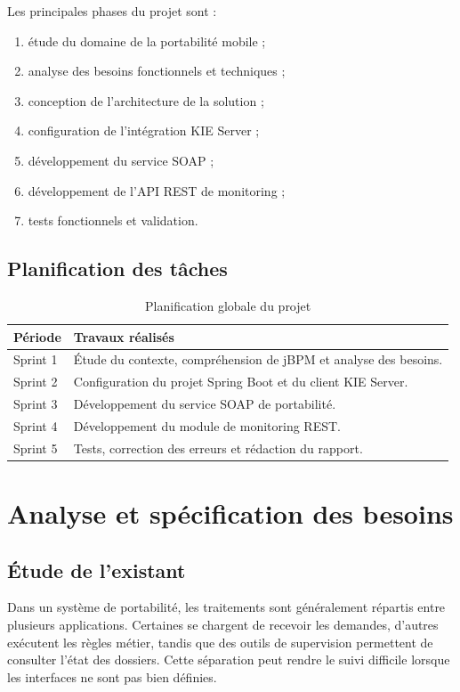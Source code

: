 \documentclass[12pt,a4paper]{report}
\begin{document}
Les principales phases du projet sont :
\begin{enumerate}
    \item étude du domaine de la portabilité mobile ;
    \item analyse des besoins fonctionnels et techniques ;
    \item conception de l'architecture de la solution ;
    \item configuration de l'intégration KIE Server ;
    \item développement du service SOAP ;
    \item développement de l'API REST de monitoring ;
    \item tests fonctionnels et validation.
\end{enumerate}

\section{Planification des tâches}
\begin{table}[h]
    \centering
    \begin{tabular}{p{4cm}p{8cm}}
        \toprule
        \textbf{Période} & \textbf{Travaux réalisés} \\
        \midrule
        Sprint 1 & Étude du contexte, compréhension de jBPM et analyse des besoins. \\
        Sprint 2 & Configuration du projet Spring Boot et du client KIE Server. \\
        Sprint 3 & Développement du service SOAP de portabilité. \\
        Sprint 4 & Développement du module de monitoring REST. \\
        Sprint 5 & Tests, correction des erreurs et rédaction du rapport. \\
        \bottomrule
    \end{tabular}
    \caption{Planification globale du projet}
\end{table}

\chapter{Analyse et spécification des besoins}
\section{Étude de l'existant}
Dans un système de portabilité, les traitements sont généralement répartis entre plusieurs applications. Certaines se chargent de recevoir les demandes, d'autres exécutent les règles métier, tandis que des outils de supervision permettent de consulter l'état des dossiers. Cette séparation peut rendre le suivi difficile lorsque les interfaces ne sont pas bien définies.
\end{document}
